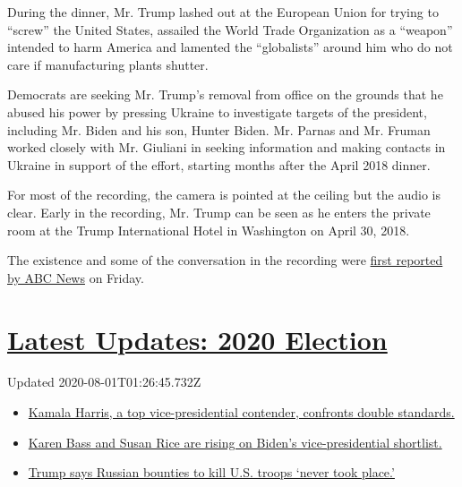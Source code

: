 During the dinner, Mr. Trump lashed out at the European Union for trying
to ``screw'' the United States, assailed the World Trade Organization as
a ``weapon'' intended to harm America and lamented the ``globalists''
around him who do not care if manufacturing plants shutter.

Democrats are seeking Mr. Trump's removal from office on the grounds
that he abused his power by pressing Ukraine to investigate targets of
the president, including Mr. Biden and his son, Hunter Biden. Mr. Parnas
and Mr. Fruman worked closely with Mr. Giuliani in seeking information
and making contacts in Ukraine in support of the effort, starting months
after the April 2018 dinner.

For most of the recording, the camera is pointed at the ceiling but the
audio is clear. Early in the recording, Mr. Trump can be seen as he
enters the private room at the Trump International Hotel in Washington
on April 30, 2018.

The existence and some of the conversation in the recording were
\href{https://abcnews.go.com/Politics/recording-appears-capture-trump-private-dinner-ukraine-ambassador/story?id=68506437}{first
reported by ABC News} on Friday.

\hypertarget{latest-updates-2020-election}{%
\section{\texorpdfstring{\href{https://www.nytimes.com/2020/07/31/us/elections/biden-vs-trump.html?action=click\&pgtype=Article\&state=default\&region=MAIN_CONTENT_1\&context=storylines_live_updates}{Latest
Updates: 2020
Election}}{Latest Updates: 2020 Election}}\label{latest-updates-2020-election}}

Updated 2020-08-01T01:26:45.732Z

\begin{itemize}
\tightlist
\item
  \href{https://www.nytimes.com/2020/07/31/us/elections/biden-vs-trump.html?action=click\&pgtype=Article\&state=default\&region=MAIN_CONTENT_1\&context=storylines_live_updates\#link-29fdff45}{Kamala
  Harris, a top vice-presidential contender, confronts double
  standards.}
\item
  \href{https://www.nytimes.com/2020/07/31/us/elections/biden-vs-trump.html?action=click\&pgtype=Article\&state=default\&region=MAIN_CONTENT_1\&context=storylines_live_updates\#link-13ec3d9c}{Karen
  Bass and Susan Rice are rising on Biden's vice-presidential
  shortlist.}
\item
  \href{https://www.nytimes.com/2020/07/31/us/elections/biden-vs-trump.html?action=click\&pgtype=Article\&state=default\&region=MAIN_CONTENT_1\&context=storylines_live_updates\#link-49e9a016}{Trump
  says Russian bounties to kill U.S. troops `never took place.'}
\end{itemize}

